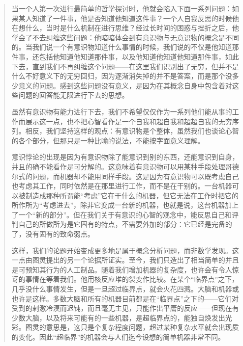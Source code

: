 \begin{quote}
当一个人第一次进行最简单的哲学探讨时，他就会陷入下面一系列问题：如果某人知道了一件事，他是否知道他知道这件事？一个人自我反思的时候他在想什么，当时是什么机制在进行思维？经过长时间的困惑与挫折之后，他学会了不去纠缠这些问题：他暗暗体会到有意识物与无意识物的概念是不同的。当我们说一个有意识物知道什么事情的时候，我们说的不仅是他知道那件事，还包括他知道他知道那件事，以及他知道他知道他知道那件事，如此下去，直到我们不再纠缠这个问题——在这里我们识别出了无穷，但并不是什么不好意义下的无穷回归，因为逐渐消失掉的并不是答案，而是那个没多少意义的问题。感到这些问题没有意义，是因为在其概念自身中包含着对这些问题的回答能无限进行下去的思想。

虽然有意识物有能力进行下去，我们不希望仅仅作为一系列他们能从事的工作而展示这一点，也不把心智看作是一个自我和超自我和超超自我的无穷序列。相反，我们坚持这样的观点：有意识物是个整体，虽然我们也谈论心智的各个部分，但那只是一种比喻的说法，不能按字面意义理解。

意识悖论的出现是因为有意识物除了能意识到别的东西，还能意识到自身，并且的确不能看作是可分解的。这意味着有意识物可以用某种手段处理哥德尔式的问题，而机器却不能用同样手段。这是因为有意识物可以既考虑自己也考虑其工作，同时依然是在那里进行工作，而不是在干别的。一台机器可以被制造成那种所谓能“考虑”它在干什么的机器，但它无法在工作时把它的所作所为“考虑进去”，除非它变成一台新的机器，也就是说，这台机器加上了一个“新的部分”。但在我们关于有意识的心智的观念中，能反思自己和评判自己的所做所为是它固有的特点，不需要外加的部分：它已经是完备的了，没有固有的致命弱点。

这样，我们的论题开始变成更多地是属于概念分析问题，而非数学发现。这一点由图灵提出的另一个论据所证实。至今，我们只造出了相当简单的并且是可预知其行为的人工制品。随着我们增加机器的复杂度，也许会有令人惊讶的事情在等着我们。他用核反应堆的裂变作比较。在某个“临界点”之下，几乎没什么事情发生，但是一旦超过临界点，就会火花四溅。大脑和机器或也许是这样。多数大脑和所有的机器目前都是在“临界点”之下的——它们对受到的剌激冷漠而迟钝，而且毫无主见，只能作出平庸的反应——但现在有少数大脑，以及将来可能有的一些机器，是超临界点的，能独自焕发出光彩。图灵的意思是，这只是个复杂程度问题，超过某种复杂水平就会出现质的变化。因此“超临界”的机器会与人们迄今设想的简单机器非常不同。


\end{quote}
